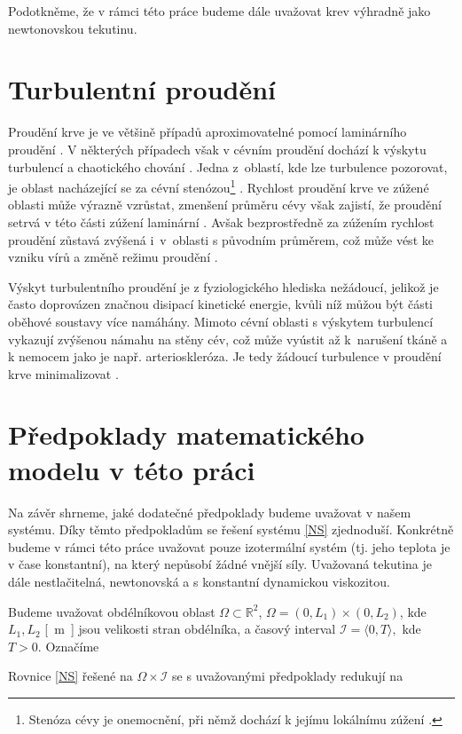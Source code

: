 Podotkněme, že v rámci této práce budeme dále uvažovat krev výhradně jako newtonovskou tekutinu.

\section*{\fontsize{11}{15}\selectfont Turbulentní proudění}
Proudění krve je ve většině případů aproximovatelné pomocí laminárního proudění \cite{Sequeira}. V některých případech však v cévním proudění dochází k výskytu turbulencí a chaotického chování \cite{Saqr2020}. Jedna z~oblastí, kde lze turbulence pozorovat, je oblast nacházející se za cévní stenózou\footnote{Stenóza cévy je onemocnění, při němž dochází k jejímu lokálnímu zúžení  \cite{Carabello2009}.} \cite{Jain2022}. Rychlost proudění krve ve zúžené oblasti může výrazně vzrůstat, zmenšení průměru cévy však zajistí, že proudění setrvá v této části zúžení laminární \cite{Sequeira}. Avšak bezprostředně za zúžením rychlost proudění zůstavá zvýšená i~v~oblasti s původním průměrem, což může vést ke vzniku vírů a změně režimu proudění \cite{Saloner2019, Varghese2003}.

Výskyt turbulentního proudění je z fyziologického hlediska nežádoucí, jelikož je často doprovázen značnou disipací kinetické energie, kvůli níž můžou být části oběhové soustavy více namáhány. Mimoto cévní oblasti s výskytem turbulencí vykazují zvýšenou námahu na stěny cév, což může vyústit až k~narušení tkáně a k nemocem jako je např. arterioskleróza. Je tedy žádoucí turbulence v proudění krve minimalizovat \cite{Saloner2019, Kameneva2004}. 

\section{Předpoklady matematického modelu v této práci}\label{pred}
Na závěr shrneme, jaké dodatečné předpoklady budeme uvažovat v našem systému. Díky těmto předpokladům se řešení systému \eqref{NS} zjednoduší. Konkrétně budeme v rámci této práce uvažovat pouze izotermální systém (tj. jeho teplota je v čase konstantní), na který nepůsobí žádné vnější síly. Uvažovaná tekutina je dále nestlačitelná, newtonovská a s konstantní dynamickou viskozitou.

Budeme uvažovat obdélníkovou oblast $ \Omega \subset \mathbb{R}^2 $, $ \Omega = (0, L_1) \times (0, L_2) $, kde $ L_1, L_2 $ \si{[m]} jsou velikosti stran obdélníka, a časový interval $ \mathcal{I} = \langle 0, T \rangle,$ kde $ T > 0$. Označíme 

Rovnice \eqref{NS} řešené na $ \Omega \times \mathcal{I} $ se s uvažovanými předpoklady redukují na \cite{Schlichting}

